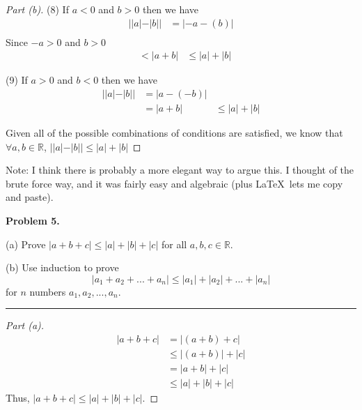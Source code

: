 \documentclass[leqno]{article}
\theoremstyle{nonumberplain}
\newtheorem{proof}{Proof}
\begin{document}
\begin{proof}[Part (b)]
(8) If $a<0$ and $b>0$ then we have
\begin{align*}
||a|-|b|| &= |-a-(b)|\\
\end{align*}
Since $-a>0$ and $b>0$
\begin{align*}
&< |a+b|
&\leq |a|+|b|
\end{align*}

(9) If $a>0$ and $b<0$ then we have
\begin{align*}
||a|-|b|| &= |a-(-b)|\\
&=|a+b|
&\leq |a|+|b|
\end{align*}

Given all of the possible combinations of conditions are satisfied, we know that $\forall a, b \in \mathbb{R}$, $||a|-|b||\leq |a|+|b|$
\end{proof}

Note: I think there is probably a more elegant way to argue this.  I thought of the brute force way, and it was fairly easy and algebraic (plus \LaTeX ~lets me copy and paste).

\pagebreak




\noindent\textbf{Problem 5.} 

(a) Prove $|a + b +c| \leq |a|+|b|+|c|$ for all $a,b,c \in \mathbb{R}$. 

(b) Use induction to prove
\[
|a_1 + a_2 +... +a_n| \leq |a_1| +|a_2| + ... + |a_n|
\]
for $n$ numbers $a_1, a_2, ...,a_n$.

\noindent\rule[0.5ex]{\linewidth}{1pt}

\begin{proof}[Part (a)]
\begin{align*}
|a+b+c| &= |(a+b)+c|\\
&\leq |(a+b)|+|c|\\
&= |a+b|+|c|\\
&\leq |a|+|b|+|c|
\end{align*}
Thus, $|a+b+c| \leq |a|+|b|+|c|$.
\end{proof}
\end{document}
